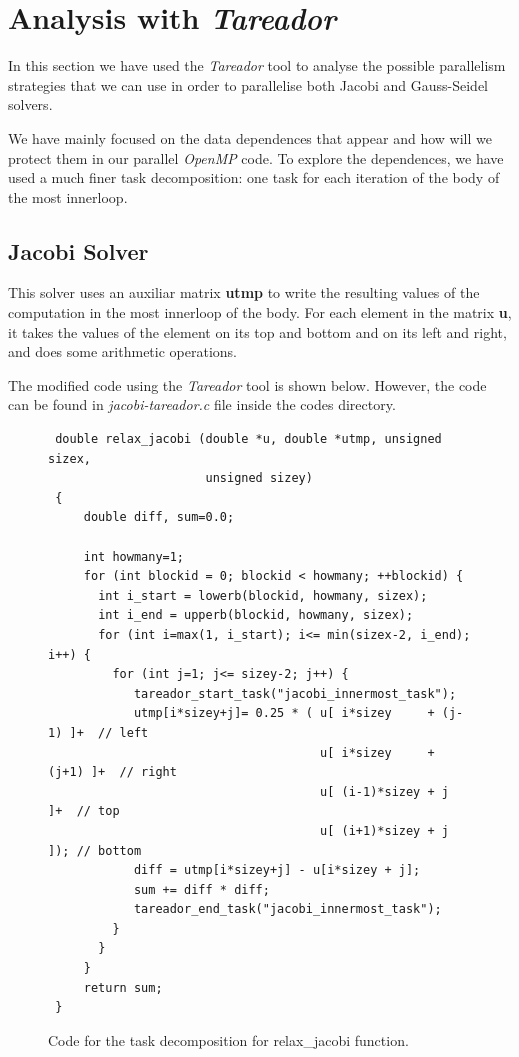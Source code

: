 \documentclass[12pt, a4paper]{article}
\begin{document}
\section{Analysis with \textit{Tareador}}

In this section we have used the \textit{Tareador} tool to analyse the possible parallelism strategies that we can use in order to parallelise both Jacobi and Gauss-Seidel solvers. 

We have mainly focused on the data dependences that appear and how will we protect them in our parallel \textit{OpenMP} code. To explore the dependences, we have used a much finer task decomposition: one task for each iteration of the body of the most innerloop.

\subsection{Jacobi Solver}

This solver uses an auxiliar matrix \textbf{utmp} to write the resulting values of the computation in the most innerloop of the body. For each element in the matrix \textbf{u}, it takes the values of the element on its top and bottom and on its left and right, and does some arithmetic operations.

The modified code using the \textit{Tareador} tool is shown below. However, the code can be found in \textit{jacobi-tareador.c} file inside the codes directory.

\begin{figure}[H]
\hspace{-0.5cm}
\begin{lstlisting}
 double relax_jacobi (double *u, double *utmp, unsigned sizex,
 				      unsigned sizey)
 {
     double diff, sum=0.0;
   
     int howmany=1;
     for (int blockid = 0; blockid < howmany; ++blockid) {
       int i_start = lowerb(blockid, howmany, sizex);
       int i_end = upperb(blockid, howmany, sizex);
       for (int i=max(1, i_start); i<= min(sizex-2, i_end); i++) {
         for (int j=1; j<= sizey-2; j++) {
 			tareador_start_task("jacobi_innermost_task");
 			utmp[i*sizey+j]= 0.25 * ( u[ i*sizey     + (j-1) ]+  // left
 							   		  u[ i*sizey     + (j+1) ]+  // right
 	   								  u[ (i-1)*sizey + j     ]+  // top
 				   					  u[ (i+1)*sizey + j     ]); // bottom
 			diff = utmp[i*sizey+j] - u[i*sizey + j]; 
 			sum += diff * diff;
		 	tareador_end_task("jacobi_innermost_task");
	     }
       }
     }
     return sum;
 }
\end{lstlisting}
\label{code:tareador-relax-jacobi}
\caption{Code for the task decomposition for relax\_jacobi function.}
\end{figure}
\end{document}
